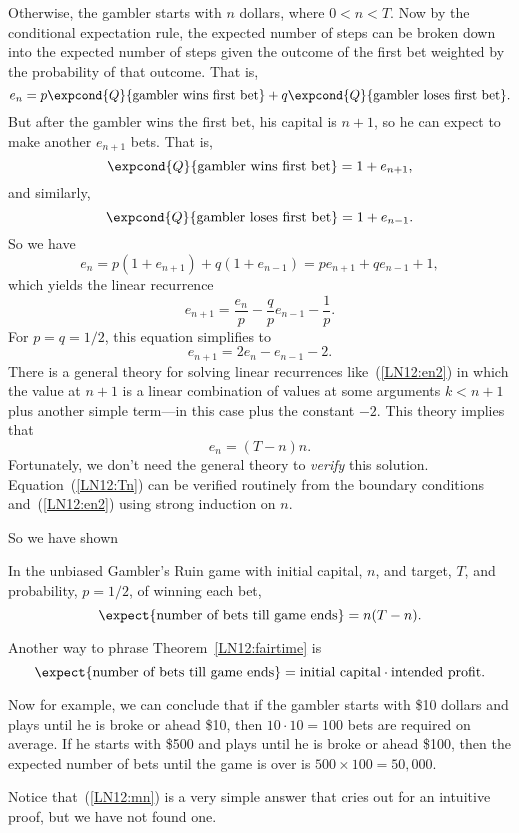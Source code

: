 \begin{editingnotes}
Otherwise, the gambler starts with $n$ dollars, where $0 < n < T$.
Now by the conditional expectation rule, the expected number of steps can
be broken down into the expected number of steps given the outcome of the
first bet weighted by the probability of that outcome.  That is,
\[
e_n = p\expcond{Q}{\text{gambler wins first bet}} +
q\expcond{Q}{\text{gambler loses first bet}}.
\]
But after the gambler wins the first bet, his capital is $n+1$, so
he can expect to make another $e_{n+1}$ bets.  That is,
\[
\expcond{Q}{\text{gambler wins first bet}} = 1 + e_{n+1},
\]
and similarly, 
\[
\expcond{Q}{\text{gambler loses first bet}} = 1 + e_{n-1}.
\]
So we have
\[
e_n =  p(1 + e_{n+1}) +  q(1 + e_{n-1}) =  pe_{n+1} + qe_{n-1} + 1, 
\]
which yields the linear recurrence
\[
e_{n+1} = \frac{e_n}{p} - \frac{q}{p} e_{n-1} - \frac{1}{p}.
\]
For $p = q = 1/2$, this equation simplifies to
\begin{equation}\label{LN12:en2}
e_{n+1} = 2e_n - e_{n-1} - 2.
\end{equation}
There is a general theory for solving linear recurrences like~(\ref{LN12:en2})
in which the value at $n+1$ is a linear combination of values at some
arguments $k<n+1$ plus another simple term---in this case plus the constant
$-2$.  This theory implies that
\begin{equation}\label{LN12:Tn}
e_n  = (T - n)n.
\end{equation}
Fortunately, we don't need the general theory to \emph{verify} this
solution.  Equation~(\ref{LN12:Tn}) can be verified routinely from the boundary
conditions and~(\ref{LN12:en2}) using strong induction on $n$.

So we have shown
\begin{theorem}\label{LN12:fairtime}
In the unbiased Gambler's Ruin game with initial capital, $n$, and target,
$T$, and probability, $p = 1/2$, of winning each bet,
\begin{equation}
\expect{\text{number of bets till game ends}} = n(T-n).
\end{equation}
\end{theorem}

Another way to phrase Theorem~\ref{LN12:fairtime} is
\begin{equation}\label{LN12:mn}
\expect{\text{number of bets till game ends}} = \text{initial capital}
\cdot \text{intended profit}.
\end{equation}

Now for example, we can conclude that if the gambler starts with \$10
dollars and plays until he is broke or ahead \$10, then $10 \cdot 10 = 100$
bets are required on average.  If he starts with \$500 and plays until he
is broke or ahead \$100, then the expected number of bets until the game is
over is $500 \times 100 = 50,000$.

Notice that~(\ref{LN12:mn}) is a very simple answer that cries out for an
intuitive proof, but we have not found one.

\end{editingnotes}

